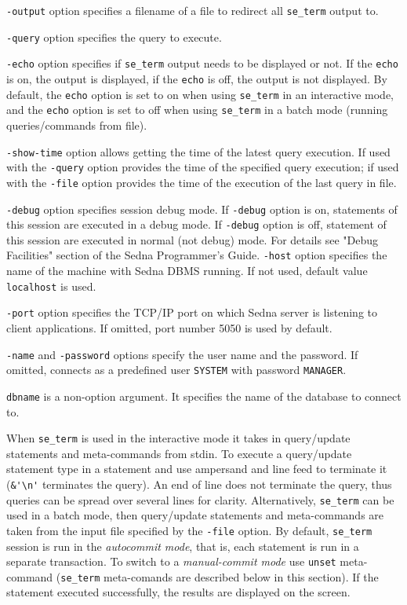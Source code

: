 \documentclass[a4paper,12pt]{article}
\begin{document}
\verb!-output! option specifies a filename of a file to redirect all \verb!se_term! output to. 

\verb!-query! option specifies the query to execute.

\verb!-echo! option specifies if \verb!se_term! output needs to be displayed or not. If the \verb!echo! is on, the output is displayed, if the \verb!echo! is off, the output is not displayed. By default, the \verb!echo! option is set to on when using \verb!se_term! in an interactive mode, and the \verb!echo! option is set to off when using \verb!se_term! in a batch mode (running queries/commands from file).

\verb!-show-time! option allows getting the time of the latest query execution. If used with the \verb!-query! option provides the time of the specified query execution; if used with the \verb!-file! option provides the time of the execution of the last query in file.

\verb!-debug! option specifies session debug mode. If \verb!-debug! option is on, statements of this session are executed in a debug mode. If \verb!-debug! option is off, statement of this session are executed in normal (not debug) mode. For details see "Debug Facilities" section of the Sedna Programmer's Guide.
\verb!-host! option specifies the name of the machine with Sedna DBMS running. If not used, default value \verb!localhost! is used.

\verb!-port! option specifies the TCP/IP port on which Sedna server is listening to client applications. If omitted, port number 5050 is used by default.

\verb!-name! and \verb!-password! options specify the user name and the password. If omitted, connects as a predefined user \verb!SYSTEM! with password \verb!MANAGER!.

\verb!dbname! is a non-option argument. It specifies the name of the database to connect to.

When \verb!se_term! is used in the interactive mode it takes in query/update statements and meta-commands from stdin. To execute a query/update statement type in a statement and use ampersand and line feed to terminate it (\verb!&'\n'! terminates the query). An end of line does not terminate the query, thus queries can be spread over several lines for clarity. Alternatively, \verb!se_term! can be used in a batch mode, then query/update statements and meta-commands are taken from the input file specified by the \verb!-file! option. By default, \verb!se_term! session is run in the \emph{autocommit mode}, that is, each statement is run in a separate transaction. To switch to a \emph{manual-commit mode} use \verb!unset! meta-command (\verb!se_term! meta-comands are described below in this section). If the statement executed successfully, the results are displayed on the screen.
\end{document}
